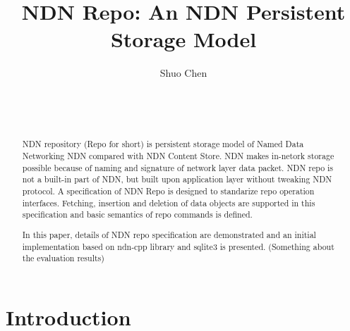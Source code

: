 \documentclass{acm_proc_article-sp}
\begin{document}
\title{NDN Repo: An NDN Persistent Storage Model}


\author{
\alignauthor
Shuo Chen\\
  \\
  \\
  \\
}
\maketitle

\begin{abstract}
NDN repository (Repo for short) is persistent storage model of Named Data Networking NDN compared with NDN Content Store. NDN makes in-netork storage possible because of naming and signature of network layer data packet. NDN repo is not a built-in part of NDN, but built upon application layer without tweaking NDN protocol. A specification of NDN Repo is designed to standarize repo operation interfaces. Fetching, insertion and deletion of data objects are supported in this specification and basic semantics of repo commands is defined.

In this paper, details of NDN repo specification are demonstrated and an initial implementation based on ndn-cpp library and sqlite3 is presented. (Something about the evaluation results)
\end{abstract}

\section{Introduction}
\end{document}
